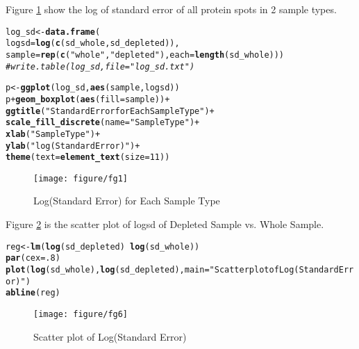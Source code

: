 \documentclass{article}\usepackage[]{graphicx}\usepackage[]{color}
\makeatletter
\def\maxwidth{ %
  \ifdim\Gin@nat@width>\linewidth
    \linewidth
  \else
    \Gin@nat@width
  \fi
}
\newcommand{\hlnum}[1]{\textcolor[rgb]{0.686,0.059,0.569}{#1}}%
\newcommand{\hlstr}[1]{\textcolor[rgb]{0.192,0.494,0.8}{#1}}%
\newcommand{\hlcom}[1]{\textcolor[rgb]{0.678,0.584,0.686}{\textit{#1}}}%
\newcommand{\hlopt}[1]{\textcolor[rgb]{0,0,0}{#1}}%
\newcommand{\hlstd}[1]{\textcolor[rgb]{0.345,0.345,0.345}{#1}}%
\newcommand{\hlkwb}[1]{\textcolor[rgb]{0.69,0.353,0.396}{#1}}%
\newcommand{\hlkwc}[1]{\textcolor[rgb]{0.333,0.667,0.333}{#1}}%
\newcommand{\hlkwd}[1]{\textcolor[rgb]{0.737,0.353,0.396}{\textbf{#1}}}%
\newenvironment{kframe}{%
 \def\at@end@of@kframe{}%
 \ifinner\ifhmode%
  \def\at@end@of@kframe{\end{minipage}}%
  \begin{minipage}{\columnwidth}%
 \fi\fi%
 \def\FrameCommand##1{\hskip\@totalleftmargin \hskip-\fboxsep
 \colorbox{shadecolor}{##1}\hskip-\fboxsep
     \hskip-\linewidth \hskip-\@totalleftmargin \hskip\columnwidth}%
 \MakeFramed {\advance\hsize-\width
   \@totalleftmargin\z@ \linewidth\hsize
   \@setminipage}}%
 {\par\unskip\endMakeFramed%
 \at@end@of@kframe}
\newenvironment{knitrout}{}{} %
\makeatother
\begin{document}
Figure \ref{fig:fg1} show the log of standard error of all protein spots in 2 sample types.

\begin{knitrout}
\color{fgcolor}\begin{kframe}
\begin{alltt}
\hlstd{log_sd} \hlkwb{<-} \hlkwd{data.frame}\hlstd{(}
  \hlkwc{logsd} \hlstd{=} \hlkwd{log}\hlstd{(}\hlkwd{c}\hlstd{(sd_whole, sd_depleted)),}
  \hlkwc{sample} \hlstd{=} \hlkwd{rep}\hlstd{(}\hlkwd{c}\hlstd{(}\hlstr{"whole"}\hlstd{,} \hlstr{"depleted"}\hlstd{),} \hlkwc{each} \hlstd{=} \hlkwd{length}\hlstd{(sd_whole)))}
\hlcom{# write.table(log_sd, file = "log_sd.txt")}

\hlstd{p} \hlkwb{<-} \hlkwd{ggplot}\hlstd{(log_sd,} \hlkwd{aes}\hlstd{(sample, logsd))}
\hlstd{p} \hlopt{+} \hlkwd{geom_boxplot}\hlstd{(}\hlkwd{aes}\hlstd{(}\hlkwc{fill} \hlstd{= sample))} \hlopt{+}
  \hlkwd{ggtitle}\hlstd{(}\hlstr{"Standard Error for Each Sample Type"}\hlstd{)} \hlopt{+}
  \hlkwd{scale_fill_discrete}\hlstd{(}\hlkwc{name}\hlstd{=} \hlstr{"Sample Type"}\hlstd{)} \hlopt{+}
  \hlkwd{xlab}\hlstd{(}\hlstr{"Sample Type"}\hlstd{)} \hlopt{+}
  \hlkwd{ylab}\hlstd{(}\hlstr{"log(Standard Error)"}\hlstd{)} \hlopt{+}
  \hlkwd{theme}\hlstd{(}\hlkwc{text} \hlstd{=} \hlkwd{element_text}\hlstd{(}\hlkwc{size}\hlstd{=}\hlnum{11}\hlstd{))}
\end{alltt}
\end{kframe}\begin{figure}[H]

\texttt{[image: figure/fg1]} \caption[Log(Standard Error) for Each Sample Type]{Log(Standard Error) for Each Sample Type\label{fig:fg1}}
\end{figure}


\end{knitrout}


Figure \ref{fig:fg6} is the scatter plot of logsd of Depleted Sample vs. Whole Sample.

\begin{knitrout}
\color{fgcolor}\begin{kframe}
\begin{alltt}
\hlstd{reg} \hlkwb{<-} \hlkwd{lm}\hlstd{(}\hlkwd{log}\hlstd{(sd_depleted)}\hlopt{~}\hlkwd{log}\hlstd{(sd_whole))}
\hlkwd{par}\hlstd{(}\hlkwc{cex}\hlstd{=}\hlnum{.8}\hlstd{)}
\hlkwd{plot}\hlstd{(}\hlkwd{log}\hlstd{(sd_whole),} \hlkwd{log}\hlstd{(sd_depleted),} \hlkwc{main} \hlstd{=}\hlstr{"Scatter plot of Log(Standard Error)"} \hlstd{)}
\hlkwd{abline}\hlstd{(reg)}
\end{alltt}
\end{kframe}\begin{figure}[H]

\texttt{[image: figure/fg6]} \caption[Scatter plot of Log(Standard Error)]{Scatter plot of Log(Standard Error)\label{fig:fg6}}
\end{figure}


\end{knitrout}
\end{document}
